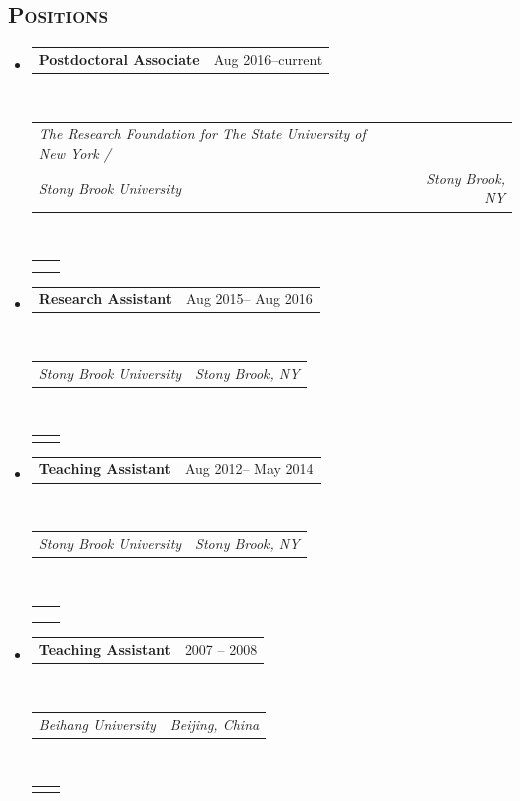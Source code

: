 \documentclass[12pt, letterpaper]{article}
\makeatletter
\newcommand{\headerrow}[2]
{\begin{tabular*}{\linewidth}{l@{\extracolsep{\fill}}r}
	#1 &
	#2 \\
\end{tabular*}}
\makeatother
\begin{document}
\subsection*{\textsc{Positions}}
\begin{itemize}
    \parskip=0.1em
    
    \item
    \headerrow
    {\textbf{Postdoctoral Associate}}
    {{Aug 2016--current}}
    \\
    \headerrow
    {\emph{The Research Foundation for The State University of New York /} \\
     \emph{Stony Brook University}}
    {\emph{Stony Brook, NY}}
    \\
    \headerrow
    {\quad {\small Mentor: Dr. Il Memming Park} \\
    \quad {\small Computational neuroscience, Perceptual-decision making, Online learning}}
    {}
    \item
    \headerrow
    {\textbf{Research Assistant}}
    {{Aug 2015-- Aug 2016}}
    \\
    \headerrow
    {\emph{Stony Brook University}}
    {\emph{Stony Brook, NY}}
    \\
    \headerrow
    {\quad {\small Computational neuroscience, Sensory coding, Brain state inference}}
    {}
    \item
    \headerrow
    {\textbf{Teaching Assistant}}
    {{Aug 2012-- May 2014}}
    \\
    \headerrow
    {\emph{Stony Brook University}}
    {\emph{Stony Brook, NY}}
    \\
    \headerrow
    {\quad {\small AMS 102 Elements of Statistics} \\
     \quad {\small AMS 316 Introduction to Time Series Analysis} \\
     \quad {\small AMS 597 Statistical Computing}
    }
    {}
    \item
    \headerrow
    {\textbf{Teaching Assistant}}
    {{2007 -- 2008}}
    \\
    \headerrow
    {\emph{Beihang University}}
    {\emph{Beijing, China}}
    \\
    \headerrow
    {\quad {\small Computer networks}}
    {}
\end{itemize}
\end{document}
